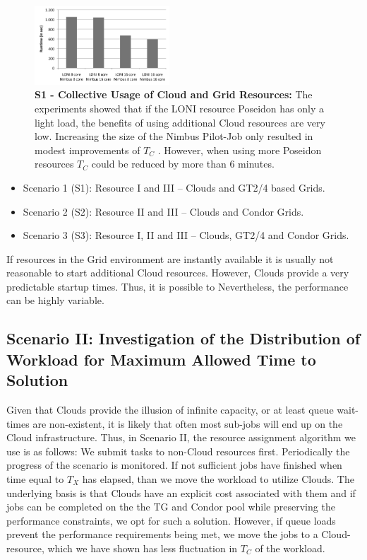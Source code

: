 \documentclass[conference,final]{IEEEtran}
\newcommand{\tmax}{$T_{max}$ }
\newcommand{\tc}{$T_{C}$ }
\begin{document}
\begin{figure}[htbp]
    \centering
        \includegraphics[width=0.45\textwidth]{performance/8replica_scenario_poseidon_nimbus}
        \caption{\textbf{S1 - Collective Usage of Cloud and Grid
            Resources: } The experiments showed that if the LONI
          resource Poseidon has only a light load, the benefits of
          using additional Cloud resources are very low. Increasing
          the size of the Nimbus Pilot-Job only resulted in modest
          improvements of \tc.  However, when using more Poseidon
          resources \tc could be reduced by more than 6 minutes.}
    \label{fig:performance_8replica_scenario_poseidon_nimbus}
\end{figure}


\begin{itemize}
\item Scenario 1 (S1): Resource I and III -- Clouds and GT2/4 based Grids. 
\item Scenario 2 (S2): Resource II and III -- Clouds and Condor Grids.
\item Scenario 3 (S3): Resource I, II and III -- Clouds, GT2/4 and Condor
  Grids.
\end{itemize}


If resources in the Grid environment are instantly available it is usually not reasonable to start
additional Cloud resources. However, Clouds provide a very predictable startup times. Thus,
it is possible to  Nevertheless,
the performance can be highly variable.

\subsection{Scenario II: Investigation of the Distribution of Workload for Maximum Allowed
  Time to Solution} 

Given that Clouds provide the illusion of infinite capacity, or at
least queue wait-times are non-existent, it is likely that often most
sub-jobs will end up on the Cloud infrastructure.  Thus, in Scenario
II, the resource assignment algorithm we use is as follows: We submit
tasks to non-Cloud resources first. Periodically the progress of the
scenario is monitored. If not sufficient jobs have finished
when time equal to $T_{X}$ has elapsed,
than we move the workload to utilize Clouds.  The
underlying basis is that Clouds have an explicit cost associated with
them and if jobs can be completed on the the TG and Condor pool while
preserving the performance constraints, we opt for such a
solution. However, if queue loads prevent the performance requirements
being met, we move the jobs to a Cloud-resource, which we have shown
has less fluctuation in \tc of the workload.
\end{document}
